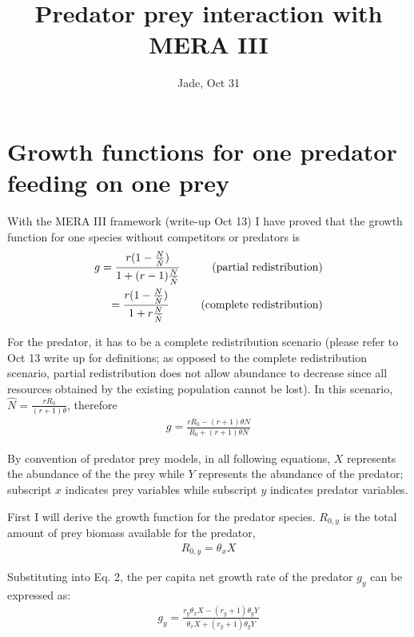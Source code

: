 \documentclass[12pt]{article}
\date{}
\title{\Large \textbf{Predator prey interaction with MERA III}}
\author{Jade, Oct 31}
\begin{document}
\maketitle
\raggedright
\large
\setlength{\parindent}{15pt}

\section{Growth functions for one predator feeding on one prey}

With the MERA III framework (write-up Oct 13) I have proved that the growth function for one species without competitors or predators is 
  \begin{equation}
 \begin{split}
g =  \frac{r (1 - \frac{N}{\hat {N}})}{1 + (r-1) \frac{N}{\hat {N}}} \hskip 1cm \mbox{(partial redistribution)}\\
= \frac{ r(1- \frac{N }{\hat{N}})} {1+ r \frac{N }{\hat{N}}}\hskip 1cm \mbox{(complete redistribution)}
\end{split}
\end{equation}

For the predator, it has to be a complete redistribution scenario (please refer to Oct 13 write up for definitions; as opposed to the complete redistribution scenario, partial redistribution does not allow abundance to decrease since all resources obtained by the existing population cannot be lost). In this scenario, $\hat {N} = \frac{r R_0 }{(r+1) \theta}$, therefore
  \begin{equation}
 \begin{split}
g =  \frac{r R_0 - (r+1) \theta N}{R_0 + (r+1) \theta N} 
\end{split}
\end{equation}

By convention of predator prey models, in all following equations, $X$ represents the abundance of the the prey while $Y$ represents the abundance of the predator; subscript $x$ indicates prey variables while subscript $y$ indicates predator variables. 

First I will derive the growth function for the predator species. $R_{0,y}$ is the total amount of prey biomass available for the predator,
  \begin{equation}
 \begin{split}
R_{0,y}  = \theta_{x}X
\end{split}
\end{equation}

Substituting into Eq. 2, the per capita net growth rate of the predator $g_y$ can be expressed as:
  \begin{equation}
 \begin{split}
g_y =  \frac{r_y \theta_{x}X  - (r_y+1) \theta_y Y}{\theta_{x}X + (r_y+1) \theta_y Y} 
\end{split}
\end{equation}
\end{document}
